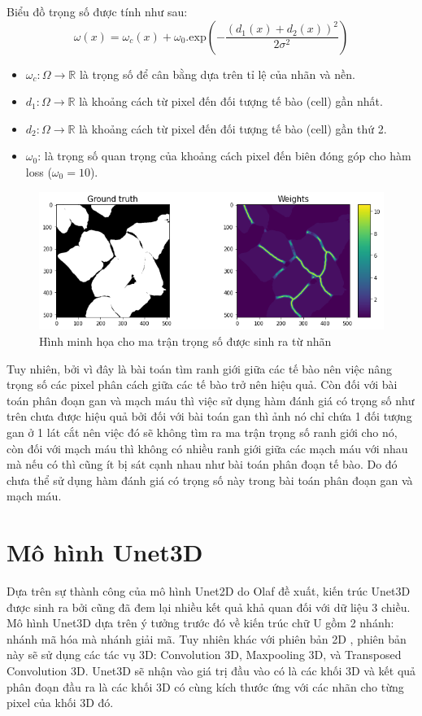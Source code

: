 Biểu đồ trọng số  được tính như sau:
\begin{equation}
    \omega(x) = \omega_{c}(x) + \omega_{0}.\mathrm{exp}\left(-\frac{(d_{1}(x) + d_{2}(x) )^{2}}{2\sigma^{2}} \right)
\end{equation}
\begin{itemize}
    \item $\omega_{c}: \Omega \rightarrow \mathbb{R}$ là trọng số để cân bằng dựa trên tỉ lệ của nhãn và nền. 
    \item $d_{1}: \Omega \rightarrow \mathbb{R}$ là khoảng cách từ pixel đến đối tượng tế bào (cell) gần nhất.
    \item $d_{2}:  \Omega \rightarrow \mathbb{R}$ là khoảng cách từ pixel đến đối tượng tế bào (cell) gần thứ 2.
    \item $\omega_0$: là trọng số quan trọng của khoảng cách pixel đến biên đóng góp cho hàm loss ($\omega_0 = 10$).
\end{itemize}

\begin{figure}[H]
    \centering
    \includegraphics[width=14cm]{images/experience/w_unet.png}
    \caption{Hình minh họa cho ma trận trọng số được sinh ra từ nhãn}
\end{figure}
Tuy nhiên, bởi vì đây là bài toán tìm ranh giới giữa các tế bào nên việc nâng trọng số các pixel phân cách giữa các tế bào trở nên hiệu quả. Còn đối với bài toán phân đoạn gan và mạch máu thì việc sử dụng hàm đánh giá có trọng số như trên chưa được hiệu quả bởi đối với bài toán gan thì ảnh nó chỉ chứa 1 đối tượng gan ở 1 lát cắt nên việc đó sẽ không tìm ra ma trận trọng số ranh giới cho nó, còn đối với mạch máu thì không có nhiều ranh giới giữa các mạch máu với nhau mà nếu có thì cũng ít bị sát cạnh nhau như bài toán phân đoạn tế bào. Do đó chưa thể sử dụng hàm đánh giá có trọng số này trong bài toán phân đoạn gan và mạch máu.

\section{Mô hình Unet3D}
\label{sec:Unet3D}
Dựa trên sự thành công của mô hình Unet2D do Olaf \cite{Unet} đề xuất, kiến trúc Unet3D được sinh ra bởi \cite{unet3d} cũng đã đem lại nhiều kết quả khả quan đối với dữ liệu 3 chiều. Mô hình Unet3D dựa trên ý tưởng trước đó về kiến trúc chữ U gồm 2 nhánh: nhánh mã hóa mà nhánh giải mã. Tuy nhiên khác với phiên bản 2D , phiên bản này sẽ sử dụng các tác vụ 3D: Convolution 3D, Maxpooling 3D, và Transposed Convolution 3D. Unet3D sẽ nhận vào giá trị đầu vào có là các khối 3D và kết quả phân đoạn đầu ra là các khối 3D có cùng kích thước ứng với các nhãn cho từng pixel của khối 3D đó.

